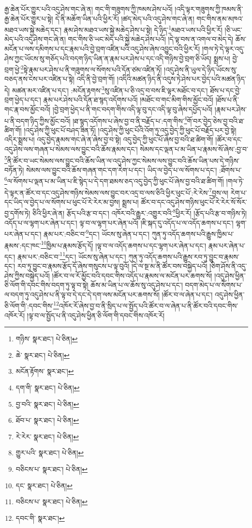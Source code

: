 རྒྱ་ཆེན་པོར་གྱུར་པའི་འདུ་ཤེས་གང་ཞེ་ན། གང་གི་གཟུགས་ཀྱི་ཁམས་ཤེས་པའོ། །འདི་ལྟར་གཟུགས་ཀྱི་ཁམས་ནི་རྒྱ་ཆེན་པོར་གྱུར་པ་སྟེ། དེ་ནི་མཆོག་ཡིན་པའི་ཕྱིར་རོ། །ཚད་མེད་པའི་འདུ་ཤེས་གང་ཞེ་ན། གང་གིས་ནམ་མཁའ་མཐའ་ཡས་སྐྱེ་མཆེད་དང་། རྣམ་ཤེས་མཐའ་ཡས་སྐྱེ་མཆེད་ཤེས་པ་སྟེ། དེ་ཉིད་\footnote{གཉིས་  སྣར་ཐང་།  པེ་ཅིན། }མཐའ་ཡས་པའི་ཕྱིར་རོ། །ཅི་ཡང་མེད་པའི་འདུ་ཤེས་གང་ཞེ་ན། གང་གིས་ཅི་ཡང་མེད་པའི་སྐྱེ་མཆེད་ཤེས་པའོ། །དེ་ལྟ་བས་ན་འགལ་བ་མེད་དེ། ཆོས་མངོན་པ་ལས་དམིགས་པ་དང་རྣམ་པའི་བྱེ་བྲག་འཛིན་པའི་འདུ་ཤེས་ཞེས་འབྱུང་བའི་ཕྱིར་རོ། །གལ་ཏེ་དེ་ལྟར་འདུ་ཤེས་ཀྱང་ཡོངས་སུ་གཅོད་པའི་བདག་ཉིད་ཡིན་ན་རྣམ་པར་ཤེས་པ་དང་འདི་གཉིས་བྱེ་བྲག་ཅི་ཡོད། སྨྲས་པ། བྱེ་བྲག་ཕྱེ་\footnote{ཆེ་  སྣར་ཐང་།  པེ་ཅིན། }སྟེ་རྣམ་པར་ཤེས་པ་ནི་གཟུགས་ལ་སོགས་པའི་དོན་ཙམ་འཛིན་ཏོ། །འདུ་ཤེས་ནི་ཡུལ་དེ་ཉིད་ཡོངས་སུ་བཅད་ནས་ངེས་པར་འཛིན་པ་སྟེ། འདི་ནི་བྱེ་བྲག་གོ། །འདིའི་མཚན་ཉིད་ནི་འདུས་ཏེ་ཤེས་པར་བྱེད་པའི་མཚན་ཉིད་དེ། མཚན་མར་འཛིན་པ་དང་། :མངོན་རྟགས་\footnote{མངོན་རྟོགས་  སྣར་ཐང་། }སུ་འཛིན་པ་ཅི་འདྲ་བ་བས་ཇི་ལྟར་མཐོང་བ་དང་། ཐོས་པ་དང་བྱེ་བྲག་ཕྱེད་པ་དང་། རྣམ་པར་ཤེས་པའི་དོན་ཐ་སྙད་འདོགས་པའོ། །མཐོང་བ་གང་མིག་གིས་མྱོང་བའོ། །ཐོས་པ་ནི་གང་རྣ་བས་མྱོང་བའོ། །བྱེ་བྲག་ཕྱེད་པ་ནི་གང་བདག་གིས་འདི་ལྟ་བུ་དང་འདི་ལྟ་བུ་ཞེས་དཔྱོད་པའོ། །རྣམ་པར་ཤེས་པ་ནི་བདག་ཉིད་ཀྱིས་མྱོང་བའོ། །ཐ་སྙད་འདོགས་པ་ཞེས་བྱ་བ་ནི་བརྗོད་པ་:དག་གིས་\footnote{དག་གི་  སྣར་ཐང་།  པེ་ཅིན། }གོ་བར་བྱེད་ཅེས་བྱ་བའི་ཐ་ཚིག་གོ། །འདུ་ཤེས་ཀྱི་ཕུང་པོ་བཤད་ཟིན་ཏོ། །འདུ་ཤེས་ཀྱི་ཕུང་པོའི་འོག་ཏུ་འདུ་བྱེད་ཀྱི་ཕུང་པོ་བརྗོད་པར་བྱེ་སྟེ། འདིར་སྨྲས་པ། འདུ་བྱེད་རྣམས་གང་ཞེ་ན་ཞེས་བྱ་བ་སྟེ། འདུ་བྱེད་ཀྱི་ཕུང་པོ་ཞེས་བྱ་བའི་ཐ་ཚིག་གོ། །ཚོར་བ་དང་འདུ་ཤེས་ལས་གཞན་པ་སེམས་ལས་བྱུང་བའི་ཆོས་རྣམས་དང་། སེམས་དང་ལྡན་པ་མ་ཡིན་པ་རྣམས་སོ་ཞེས་:བྱ་བ་\footnote{བྱ་བའི་  སྣར་ཐང་།  པེ་ཅིན། }ནི་ཚོར་བ་ཡང་སེམས་ལས་བྱུང་བའི་ཆོས་ཡིན་ལ་འདུ་ཤེས་ཀྱང་སེམས་ལས་བྱུང་བའི་ཆོས་ཡིན་པས་དེ་གཉིས་བཏོན་ཏེ། སེམས་ལས་བྱུང་བའི་ཆོས་གཞན་གང་དག་རེག་པ་དང་། ཡིད་ལ་བྱེད་པ་ལ་སོགས་པ་དང་། :ཐོགས་པ་\footnote{ཐོབ་པ་  སྣར་ཐང་།  པེ་ཅིན། }ལ་སོགས་པ་ལྡན་པ་མ་ཡིན་པ་ཇི་སྙེད་པ་དེ་དག་ཐམས་ཅད་འདུ་བྱེད་ཀྱི་ཕུང་པོ་ཞེས་བྱ་བའི་ཐ་ཚིག་གོ། །གལ་ཏེ་དེ་ལྟར་ན་ཚོར་བ་དང་འདུ་ཤེས་གཉིས་སེམས་ལས་བྱུང་བར་འདྲ་བ་ལས་ཅིའི་ཕྱིར་ཕུང་པོ་:རེ་རེས་\footnote{རེ་རེར་  སྣར་ཐང་།  པེ་ཅིན། }བྱས་ལ། རེག་པ་དང་ཡིད་ལ་བྱེད་པ་ལ་སོགས་པ་ཕུང་པོ་རེ་རེར་མ་བྱས། སྨྲས་པ། ཚོར་བ་དང་འདུ་ཤེས་གཉིས་ཕུང་པོ་རེ་རེར་སོ་སོར་བྱ་དགོས་ཏེ། ཅིའི་ཕྱིར་ཞེ་ན། རྩོད་པའི་རྩ་བ་དང་། འཁོར་བའི་རྒྱུར་:འགྱུར་བའི་\footnote{གྱུར་པའི་  སྣར་ཐང་།  པེ་ཅིན། }ཕྱིར་རོ། །རྩོད་པའི་རྩ་བ་གཉིས་ཏེ། འདོད་པ་ལ་ལྷག་པར་ཞེན་པ་དང་། ལྟ་བ་ལ་ལྷག་པར་ཞེན་པའོ། །ཇི་སྐད་དུ་འདོད་པ་ལ་འདོད་ཆགས་པ་དང་། ལྷག་པར་ཞེན་པ་དང་། རྣམ་པར་:བཅིང་བ་\footnote{བཅིངས་པ་  སྣར་ཐང་།  པེ་ཅིན། }དང་། ཡོངས་སུ་ཞེན་པ་དང་། ཀུན་ཏུ་འདོད་ཆགས་པའི་རྒྱུས་ཁྱིམ་པ་རྣམས་:དང་ཁང་\footnote{དང་  སྣར་ཐང་།  པེ་ཅིན། }ཁྱིམ་པ་རྣམས་རྩོད་དོ། །ལྟ་བ་ལ་འདོད་ཆགས་པ་དང་ལྷག་པར་ཞེན་པ་དང་། རྣམ་པར་ཞེན་པ་དང་། རྣམ་པར་:བཅིང་བ་\footnote{བཅིངས་པ་  སྣར་ཐང་།  པེ་ཅིན། }དང་། ཡོངས་སུ་ཞེན་པ་དང་། ཀུན་ཏུ་འདོད་ཆགས་པའི་རྒྱུས་རབ་ཏུ་བྱུང་བ་རྣམས་དང་། རབ་ཏུ་བྱུང་བ་རྣམས་རྩོད་དོ་ཞེས་གསུངས་པ་ལྟ་བུའོ། །དེ་ལ་སྔ་མ་ནི་ཚོར་བས་བསྐྱེད་པའོ། །ཅིག་ཤོས་ནི་འདུ་ཤེས་ཀྱིས་བསྐྱེད་པའོ། །ཚོར་བ་ལ་རོ་མྱོང་བའི་དབང་གིས་འདོད་པ་རྣམས་ལ་མངོན་པར་ཆགས་སོ། །འདུ་ཤེས་ཕྱིན་ཅི་ལོག་གི་དབང་གིས་བདག་ཏུ་ལྟ་བ་སྟེ། ཆོས་མ་ཡིན་པ་ལ་ཆོས་སུ་འདུ་ཤེས་པ་དང་། བདག་མེད་པ་ལ་སོགས་པ་ལ་བདག་ཏུ་འདུ་ཤེས་པ་ནི་ལྟ་བ་དེ་དང་དེ་དག་ལས་མངོན་པར་ཆགས་སོ། །ཚོར་བ་ལ་ཞེན་པ་དང་། འདུ་ཤེས་ཕྱིན་ཅི་ལོག་གི་:དབང་གིས་\footnote{དབང་གི་  སྣར་ཐང་། }འཁོར་རོ་ཞེས་བྱ་བ་ནི་སྲིད་པ་ལ་སྤྱོད་པའི་ཚོར་བ་ལ་ཞེན་པ་ནི་ཚོར་བའི་དབང་གིས་འཁོར་རོ། །ལྟ་བ་ལ་སྤྱོད་པ་ནི་འདུ་ཤེས་ཕྱིན་ཅི་ལོག་གི་དབང་གིས་འཁོར་རོ། 